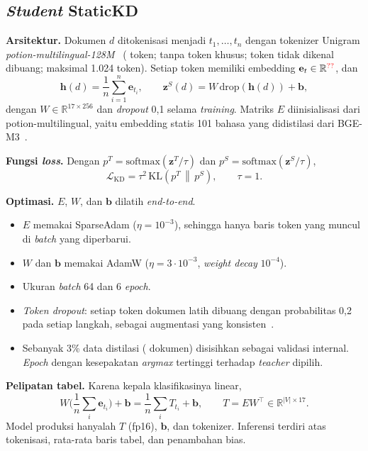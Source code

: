 \documentclass[journal]{IEEEtran}
\newcommand{\eng}[1]{\textit{#1}}   %
\begin{document}
\subsection{\eng{Student} StaticKD}
\textbf{Arsitektur.} Dokumen $d$ ditokenisasi menjadi $t_1,\dots,t_n$ dengan tokenizer Unigram \eng{potion-multilingual-128M}~\cite{tulkens2024model2vec} ( token; tanpa token khusus; token tidak dikenal dibuang; maksimal 1.024 token). Setiap token memiliki embedding $\mathbf{e}_t\in\mathbb{R}^{\val{student.dim}}$, dan
\begin{equation}
\mathbf{h}(d)=\frac{1}{n}\sum_{i=1}^{n}\mathbf{e}_{t_i},\qquad
\mathbf{z}^{S}(d)=W\,\mathrm{drop}(\mathbf{h}(d))+\mathbf{b},
\label{eq:student}
\end{equation}
dengan $W\in\mathbb{R}^{17\times 256}$ dan \eng{dropout} 0,1 selama \eng{training}. Matriks $E$ diinisialisasi dari potion-multilingual, yaitu embedding statis 101 bahasa yang didistilasi dari BGE-M3~\cite{chen2024bgem3}.

\textbf{Fungsi \eng{loss}.} Dengan $p^{T}=\mathrm{softmax}(\mathbf{z}^{T}/\tau)$ dan $p^{S}=\mathrm{softmax}(\mathbf{z}^{S}/\tau)$,
\begin{equation}
\mathcal{L}_{\mathrm{KD}}=\tau^{2}\,\mathrm{KL}\!\left(p^{T}\,\middle\|\,p^{S}\right),\qquad \tau=1 .
\label{eq:kd}
\end{equation}

\textbf{Optimasi.} $E$, $W$, dan $\mathbf{b}$ dilatih \eng{end-to-end}.
\begin{itemize}
  \item $E$ memakai SparseAdam ($\eta=10^{-3}$), sehingga hanya baris token yang muncul di \eng{batch} yang diperbarui.
  \item $W$ dan $\mathbf{b}$ memakai AdamW ($\eta=3\cdot 10^{-3}$, \eng{weight decay} $10^{-4}$).
  \item Ukuran \eng{batch} 64 dan 6 \eng{epoch}.
  \item \eng{Token dropout}: setiap token dokumen latih dibuang dengan probabilitas 0,2 pada setiap langkah, sebagai augmentasi yang konsisten~\cite{beyer2022patient}.
  \item Sebanyak 3\% data distilasi ( dokumen) disisihkan sebagai validasi internal. \eng{Epoch} dengan kesepakatan \eng{argmax} tertinggi terhadap \eng{teacher} dipilih.
\end{itemize}

\textbf{Pelipatan tabel.} Karena kepala klasifikasinya linear,
\begin{equation}
W\Big(\frac{1}{n}\sum_{i}\mathbf{e}_{t_i}\Big)+\mathbf{b}=\frac{1}{n}\sum_{i}T_{t_i}+\mathbf{b},\qquad T=EW^{\top}\in\mathbb{R}^{|V|\times 17}.
\label{eq:fold}
\end{equation}
Model produksi hanyalah $T$ (fp16), $\mathbf{b}$, dan tokenizer. Inferensi terdiri atas tokenisasi, rata-rata baris tabel, dan penambahan bias.
\end{document}
